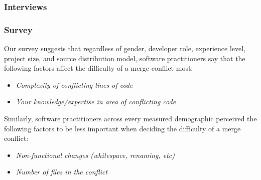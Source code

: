 

\subsubsection{Interviews}




\subsubsection{Survey}
Our survey suggests that regardless of gender, developer role, experience level, project size, and source distribution model, software practitioners say that the following factors affect the difficulty of a merge conflict most: 
\begin{itemize}
\item \textit{Complexity of conflicting lines of code}
\item \textit{Your knowledge/expertise in area of conflicting code}
\end{itemize}

Similarly, software practitioners across every measured demographic perceived the following factors to be less important when deciding the difficulty of a merge conflict:
\begin{itemize}
\item \textit{Non-functional changes (whitespace, renaming, etc)}
\item \textit{Number of files in the conflict}
\end{itemize}

